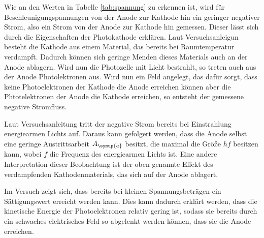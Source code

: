 Wie an den Werten in Tabelle \ref{tab:spannung} zu erkennen ist, wird für Beschleunigungspannungen
von der Anode zur Kathode hin ein geringer negativer Strom, also ein Strom von
der Anode zur Kathode hin gemessen. Dieser lässt sich durch die Eigenschaften der
Photokathode erklären. Laut Versuchsanleigun \cite{Versuchsanleitung} besteht die
Kathode aus einem Material, das bereits bei Raumtemperatur verdampft. Dadurch können
sich geringe Menden dieses Materials auch an der Anode ablagern. Wird nun die
Photozelle mit Licht bestrahlt, so treten auch aus der Anode Photolektronen aus.
Wird nun ein Feld angelegt, das dafür sorgt, dass keine Photoelektronen der Kathode
die Anode erreichen können aber die Phtotelektronen der Anode die Kathode erreichen,
so entsteht der gemessene negative Stromfluss.

Laut Versuchsanleitung \cite{Versuchsanleitung} tritt der negative Strom bereits
bei Einstrahlung energiearmen Lichts auf. Daraus kann gefolgert werden, dass die
Anode selbst eine geringe Austrittsarbeit $A_{\symup{a}}$ besitzt, die maximal die
Größe $hf$ besitzen kann, wobei $f$ die Frequenz des energiearmen Lichts ist.
Eine andere Interpretation dieser Beobachtung ist der oben genannte Effekt des
verdampfenden Kathodenmaterials, das sich auf der Anode ablagert.

Im Versuch zeigt sich, dass bereits bei kleinen Spannungsbeträgen ein Sättigungswert
erreicht werden kann. Dies kann dadurch erklärt werden, dass die kinetische Energie
der Photoelektronen relativ gering ist, sodass sie bereits durch ein schwaches
elektrisches Feld so abgelenkt werden können, dass sie die Anode erreichen.
